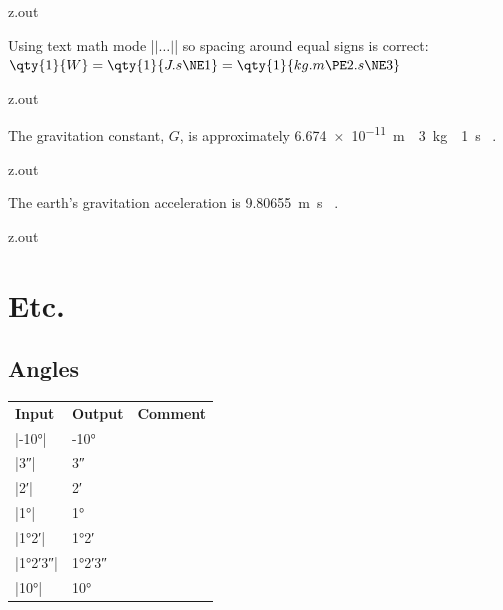\MyIO


\begin{VerbatimOut}{z.out}

Using text math mode
|\(|\ldots|\)|
so spacing around equal signs is correct:\\
\(\qty{1}{W} = \qty{1}{J.s\NE1} = \qty{1}{kg.m\PE2.s\NE3}\)
\end{VerbatimOut}

\MyIO


\begin{VerbatimOut}{z.out}

The gravitation constant,
\(G\),
is approximately
\qty{6.674e-11}{m\PE3.kg\NE1.s}
\cite{wikipedia-gravitational-constant}.
\end{VerbatimOut}

\MyIO


\begin{VerbatimOut}{z.out}

The earth's gravitation acceleration is
\qty{9.80655}{m.s}
\cite{wikipedia-gravitational-acceleration}.
\end{VerbatimOut}

\MyIO


\begin{VerbatimOut}{z.out}

\section{Etc.}

\subsection{Angles}

\begin{tabular}{@{}lll@{}}
  \textbf{Input}& \textbf{Output}& \textbf{Comment}\\
  \tabularspace
  |-\ang{10}|&    -\ang{10}\\
  |\ang{;;3}|&    \ang{;;3}\\
  |\ang{;2;}|&    \ang{;2}\\
  |\ang{1}|&      \ang{1}\\
  |\ang{1;2}|&    \ang{1;2}\\
  |\ang{1;2;3}|&  \ang{1;2;3}\\
  |\ang{10}|&     \ang{10}\\
\end{tabular}
\end{VerbatimOut}

\MyIO


